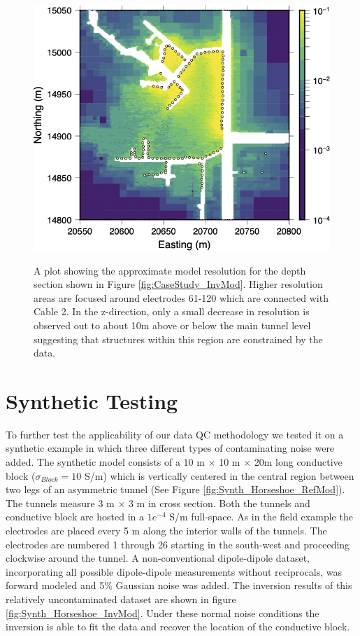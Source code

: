 \documentclass[final,authoryear,5p,times,twocolumn]{elsarticle}
\begin{document}
\begin{figure} [!ht]
    \begin{center}
       \label{fig:ModRes_CableSplitCombined_Final_z2586}
       \includegraphics[trim=0cm 0cm 0cm 0cm, clip=true,width=0.95\linewidth]{./Figures/Fig19.png}
    \end{center}
\caption{A plot showing the approximate model resolution for the depth section shown in Figure \ref{fig:CaseStudy_InvMod}. Higher resolution areas are focused around electrodes 61-120 which are connected with Cable 2. In the z-direction, only a small decrease in resolution is observed out to about 10m above or below the main tunnel level suggesting that structures within this region are constrained by the data.}
\label{fig:ModRes_CableSplitCombined_Final}
\end{figure}

\section{Synthetic Testing}
\label{Synthetic_Testing}

To further test the applicability of our data QC methodology we tested it on a synthetic example in which three different types of contaminating noise were added. The synthetic model consists of a 10 m $\times$ 10 m $\times$ 20m long conductive block ($\sigma_{Block}= 10$ S/m) which is vertically centered in the central region between two legs of an asymmetric tunnel (See Figure \ref{fig:Synth_Horseshoe_RefMod}). The tunnels measure 3 m $\times$ 3 m in cross section. Both the tunnels and conductive block are hosted in a $1e^{-4}$ S/m full-space. As in the field example the electrodes are placed every 5 m along the interior walls of the tunnels. The electrodes are numbered 1 through 26 starting in the south-west and proceeding clockwise around the tunnel. A non-conventional dipole-dipole dataset, incorporating all possible dipole-dipole measurements without reciprocals, was forward modeled and 5\% Gaussian noise was added. The inversion results of this relatively uncontaminated dataset are shown in figure \ref{fig:Synth_Horseshoe_InvMod}. Under these normal noise conditions the inversion is able to fit the data and recover the location of the conductive block.
\end{document}
